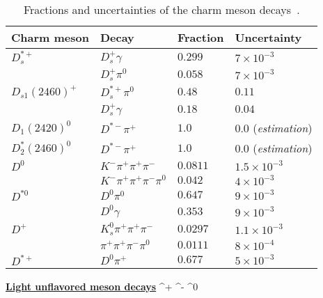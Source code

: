 {
\renewcommand{\arraystretch}{1.25}
 \begin{table}
\centering
\scriptsize
\begin{tabular}{l | l | l | l }
Charm meson & Decay & Fraction & Uncertainty \\
\hline

$D_{s}^{*+}$ & $D_{s}^{+} \gamma$  &  $0.299$ & $7\times 10^{-3}$ \\
  & $D_{s}^{+} \pi^{0}$ & $0.058$ & $7\times 10^{-3}$ \\ \hline
$D_{s 1}(2460)^{+}$ & $D_{s}^{*+} \pi^{0}$  &  $0.48$ & $0.11$ \\
  & $D_{s}^{+} \gamma$ & $0.18$ & $0.04$ \\ \hline

$D_{1}(2420)^{0}$ & $ D^{*-} \pi^{+}$  &  $1.0$ & $0.0$ (\textit{estimation}) \\ \hline  %
$D_{2}^{*}(2460)^{0}$ & $D^{*-} \pi^{+}$  &  $1.0$ & $0.0$ (\textit{estimation}) \\ \hline  %
$D^{0}$ & $K^{-} \pi^{+} \pi^{+} \pi^{-}$  &  $0.0811$ & $1.5\times 10^{-3}$  \\
 & $K^{-} \pi^{+} \pi^{+} \pi^{-} \pi^{0}$  &  $0.042$ & $4\times 10^{-3}$  \\\hline  

$D^{*0}$ & $D^{0} \pi^{0}$  &  $0.647$ & $9\times 10^{-3}$  \\
 & $D^{0} \gamma$  &  $0.353$ & $9\times 10^{-3}$  \\\hline  

$D^{+}$ & $K_{s}^{0} \pi^{+} \pi^{+} \pi^{-}$  &  $0.0297$ & $1.1\times 10^{-3}$  \\
 & $\pi^{+} \pi^{+} \pi^{-} \pi^{0}$  &  $0.0111$ & $8\times 10^{-4}$  \\\hline  

$D^{*+}$ & $D^{0} \pi^{+}$  &  $0.677$ & $5\times 10^{-3}$  \\



\end{tabular}
\caption{Fractions and uncertainties of the charm meson decays~\cite{PhysRevD.98.030001}.}
\label{tab:Ds_bkg_modes}
\end{table}
    }    
    
    



\textbf{\underline{Light unflavored meson decays}}
\eta \rightarrow \pi^{+} \pi^{-} \pi^{0}    
    
